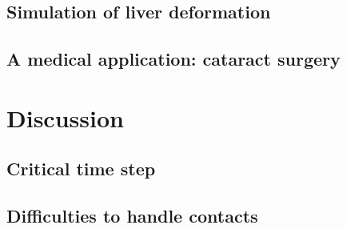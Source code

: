 	\subsection{Simulation of liver deformation}
	\subsection{A medical application: cataract surgery}
	
\section{Discussion}
	\subsection{Critical time step}
	\subsection{Difficulties to handle contacts}